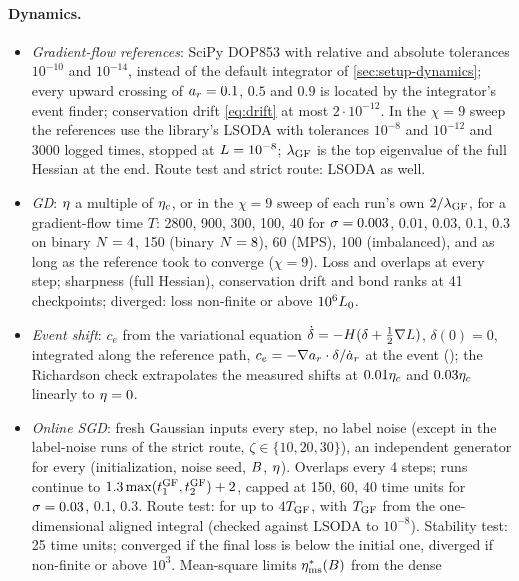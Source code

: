 \paragraph{Dynamics.}
\begin{itemize}
  \item \emph{Gradient-flow references}: SciPy DOP853 with relative and absolute tolerances $10^{-10}$ and
    $10^{-14}$, instead of the default integrator of \cref{sec:setup-dynamics}; every upward crossing of
    $a_{r}=0.1$, $0.5$ and $0.9$ is located by the integrator's event finder; conservation drift
    \eqref{eq:drift} at most $2\cdot10^{-12}$. In the $\chi=9$ sweep the references use the library's LSODA with
    tolerances $10^{-8}$ and $10^{-12}$ and 3000 logged times, stopped at $L=10^{-8}$; $\lambda_{\rm GF}$ is the top eigenvalue of the full
    Hessian at the end. Route test and strict route: LSODA as well.
  \item \emph{GD}: $\eta$ a multiple of $\eta_c$, or in the $\chi=9$ sweep of each run's own $2/\lambda_{\rm GF}$, for a
    gradient-flow time $T$: 2800, 900, 300, 100, 40 for $\sigma=0.003$, $0.01$, $0.03$, $0.1$, $0.3$ on binary
    $N=4$, 150 (binary $N=8$), 60 (MPS), 100 (imbalanced), and as long as the reference took to converge
    ($\chi=9$). Loss and overlaps at every step; sharpness (full Hessian), conservation drift and bond ranks
    at 41 checkpoints; diverged: loss non-finite or above $10^6L_0$.
  \item \emph{Event shift}: $c_e$ from the variational equation $\dot\delta=-H(\delta+\frac12\nabla L)$,
    $\delta(0)=0$, integrated along the reference path, $c_e=-\nabla a_{r}\cdot\delta/\dot a_r$ at the event
    (); the Richardson check extrapolates the measured shifts at $0.01\eta_c$ and
    $0.03\eta_c$ linearly to $\eta=0$.
  \item \emph{Online SGD}: fresh Gaussian inputs every step, no label noise (except in the label-noise
    runs of the strict route, $\zeta\in\{10,20,30\}$), an independent generator for every (initialization,
    noise seed, $B$, $\eta$). Overlaps every 4 steps; runs continue to $1.3\max(t_1^{\rm GF},t_2^{\rm GF})+2$,
    capped at 150, 60, 40 time units for $\sigma=0.03$, $0.1$, $0.3$. Route test: 
    for up to $4T_{\rm GF}$, with $T_{\rm GF}$ from the one-dimensional aligned integral (checked against LSODA to
    $10^{-8}$). Stability test: 25 time units; converged if the final loss is below the initial one,
    diverged if non-finite or above $10^3$. Mean-square limits $\eta^*_{\rm ms}(B)$ from the dense

\end{itemize}

